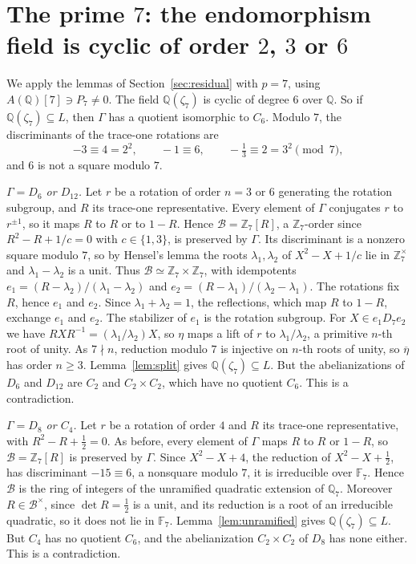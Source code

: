 \documentclass[11pt]{article}
\newcommand{\Q}{\mathbb Q}
\newcommand{\Z}{\mathbb Z}
\newcommand{\F}{\mathbb F}
\begin{document}
\section{The prime \texorpdfstring{\(7\)}{7}: the endomorphism field is cyclic of order \texorpdfstring{\(2\), \(3\) or \(6\)}{2, 3 or 6}}\label{sec:prime-7}

We apply the lemmas of Section~\ref{sec:residual} with \(p=7\), using
\(A(\Q)[7]\ni P_7\neq0\). The field \(\Q(\zeta_7)\) is cyclic of degree
\(6\) over \(\Q\). So if \(\Q(\zeta_7)\subseteq L\), then \(\Gamma\) has
a quotient isomorphic to \(C_6\). Modulo \(7\), the discriminants of the
trace-one rotations are
\[
 -3\equiv4=2^2,\qquad -1\equiv6,\qquad -\tfrac13\equiv2=3^2\pmod 7,
\]
and \(6\) is not a square modulo \(7\).

\emph{\(\Gamma=D_6\) or \(D_{12}\).} Let \(r\) be a rotation of order
\(n=3\) or \(6\) generating the rotation subgroup, and \(R\) its
trace-one representative. Every element of \(\Gamma\) conjugates \(r\)
to \(r^{\pm1}\), so it maps \(R\) to \(R\) or to \(1-R\). Hence
\(\mathcal B=\Z_7[R]\), a \(\Z_7\)-order since \(R^2-R+1/c=0\) with
\(c\in\{1,3\}\), is preserved by \(\Gamma\). Its discriminant is a
nonzero square modulo \(7\), so by Hensel's lemma the roots
\(\lambda_1,\lambda_2\) of \(X^2-X+1/c\) lie in \(\Z_7^\times\) and
\(\lambda_1-\lambda_2\) is a unit. Thus
\(\mathcal B\simeq\Z_7\times\Z_7\), with idempotents
\(e_1=(R-\lambda_2)/(\lambda_1-\lambda_2)\) and
\(e_2=(R-\lambda_1)/(\lambda_2-\lambda_1)\). The rotations fix \(R\),
hence \(e_1\) and \(e_2\). Since \(\lambda_1+\lambda_2=1\), the
reflections, which map \(R\) to \(1-R\), exchange \(e_1\) and \(e_2\).
The stabilizer of \(e_1\) is the rotation subgroup. For
\(X\in e_1D_7e_2\) we have \(RXR^{-1}=(\lambda_1/\lambda_2)X\), so
\(\eta\) maps a lift of \(r\) to \(\lambda_1/\lambda_2\), a primitive
\(n\)-th root of unity. As \(7\nmid n\), reduction modulo \(7\) is
injective on \(n\)-th roots of unity, so \(\overline\eta\) has order
\(n\geq3\). Lemma~\ref{lem:split} gives \(\Q(\zeta_7)\subseteq L\). But
the abelianizations of \(D_6\) and \(D_{12}\) are \(C_2\) and
\(C_2\times C_2\), which have no quotient \(C_6\). This is a
contradiction.

\emph{\(\Gamma=D_8\) or \(C_4\).} Let \(r\) be a rotation of order
\(4\) and \(R\) its trace-one representative, with
\(R^2-R+\tfrac12=0\). As before, every element of \(\Gamma\) maps \(R\)
to \(R\) or \(1-R\), so \(\mathcal B=\Z_7[R]\) is preserved by
\(\Gamma\). Since \(X^2-X+4\), the reduction of \(X^2-X+\tfrac12\), has
discriminant \(-15\equiv6\), a nonsquare modulo \(7\), it is irreducible
over \(\F_7\). Hence \(\mathcal B\) is the ring of integers of the
unramified quadratic extension of \(\Q_7\). Moreover
\(R\in\mathcal B^\times\), since \(\det R=\tfrac12\) is a unit, and its
reduction is a root of an irreducible quadratic, so it does not lie in
\(\F_7\). Lemma~\ref{lem:unramified} gives \(\Q(\zeta_7)\subseteq L\).
But \(C_4\) has no quotient \(C_6\), and the abelianization
\(C_2\times C_2\) of \(D_8\) has none either. This is a contradiction.
\end{document}

